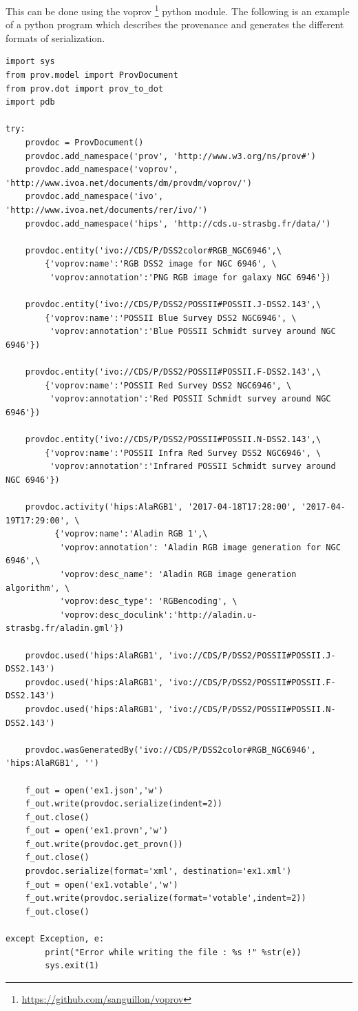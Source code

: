 This can be done using the voprov \footnote{\url{https://github.com/sanguillon/voprov}} python module.
The following is an example of a python program which describes the provenance and generates the different formats of serialization.
\begin{verbatim}
import sys
from prov.model import ProvDocument
from prov.dot import prov_to_dot
import pdb

try:
    provdoc = ProvDocument()
    provdoc.add_namespace('prov', 'http://www.w3.org/ns/prov#')
    provdoc.add_namespace('voprov', 'http://www.ivoa.net/documents/dm/provdm/voprov/')
    provdoc.add_namespace('ivo', 'http://www.ivoa.net/documents/rer/ivo/')
    provdoc.add_namespace('hips', 'http://cds.u-strasbg.fr/data/')

    provdoc.entity('ivo://CDS/P/DSS2color#RGB_NGC6946',\
        {'voprov:name':'RGB DSS2 image for NGC 6946', \
         'voprov:annotation':'PNG RGB image for galaxy NGC 6946'})

    provdoc.entity('ivo://CDS/P/DSS2/POSSII#POSSII.J-DSS2.143',\
        {'voprov:name':'POSSII Blue Survey DSS2 NGC6946', \
         'voprov:annotation':'Blue POSSII Schmidt survey around NGC 6946'})

    provdoc.entity('ivo://CDS/P/DSS2/POSSII#POSSII.F-DSS2.143',\
        {'voprov:name':'POSSII Red Survey DSS2 NGC6946', \
         'voprov:annotation':'Red POSSII Schmidt survey around NGC 6946'})

    provdoc.entity('ivo://CDS/P/DSS2/POSSII#POSSII.N-DSS2.143',\
        {'voprov:name':'POSSII Infra Red Survey DSS2 NGC6946', \
         'voprov:annotation':'Infrared POSSII Schmidt survey around NGC 6946'})

    provdoc.activity('hips:AlaRGB1', '2017-04-18T17:28:00', '2017-04-19T17:29:00', \
          {'voprov:name':'Aladin RGB 1',\
           'voprov:annotation': 'Aladin RGB image generation for NGC 6946',\
           'voprov:desc_name': 'Aladin RGB image generation algorithm', \
           'voprov:desc_type': 'RGBencoding', \
           'voprov:desc_doculink':'http://aladin.u-strasbg.fr/aladin.gml'})

    provdoc.used('hips:AlaRGB1', 'ivo://CDS/P/DSS2/POSSII#POSSII.J-DSS2.143')
    provdoc.used('hips:AlaRGB1', 'ivo://CDS/P/DSS2/POSSII#POSSII.F-DSS2.143')
    provdoc.used('hips:AlaRGB1', 'ivo://CDS/P/DSS2/POSSII#POSSII.N-DSS2.143')

    provdoc.wasGeneratedBy('ivo://CDS/P/DSS2color#RGB_NGC6946', 'hips:AlaRGB1', '')

    f_out = open('ex1.json','w')
    f_out.write(provdoc.serialize(indent=2))
    f_out.close()
    f_out = open('ex1.provn','w')
    f_out.write(provdoc.get_provn())
    f_out.close()
    provdoc.serialize(format='xml', destination='ex1.xml')
    f_out = open('ex1.votable','w')
    f_out.write(provdoc.serialize(format='votable',indent=2))
    f_out.close()

except Exception, e:
        print("Error while writing the file : %s !" %str(e))
        sys.exit(1)

\end{verbatim}

